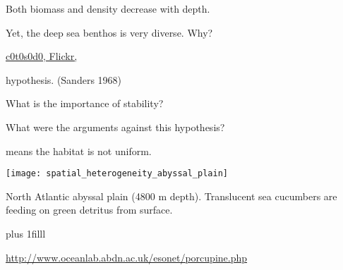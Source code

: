 \documentclass[t]{beamer}
\begin{document}
{
\begin{frame}[t]{Both biomass and density decrease with depth.}

\vspace*{10\baselineskip}

\hangpara Yet, the deep sea benthos is very diverse. Why?
\end{frame}}

%

{
\begin{frame}

\vfilll

\tiny \href{https://flickr.com/photos/c0t0s0d0/3169502387/}{c0t0s0d0, Flickr, }
\end{frame}
}

%


\begin{frame}[t]{ hypothesis. {\large (Sanders 1968)}}

	\hangpara What is the importance of stability?

	\hangpara What were the arguments against this hypothesis?

\end{frame}

%

\begin{frame}[t]{ means the habitat is not uniform.}

	{\centering
	\texttt{[image: spatial\_heterogeneity\_abyssal\_plain]}\par}

	\vspace*{-\baselineskip}\hangpara North Atlantic abyssal plain (4800 m depth). Translucent sea cucumbers are feeding on green detritus from surface.

\vskip0pt plus 1filll

\hfill\tiny\url{http://www.oceanlab.abdn.ac.uk/esonet/porcupine.php}
\end{frame}


%
\end{document}
